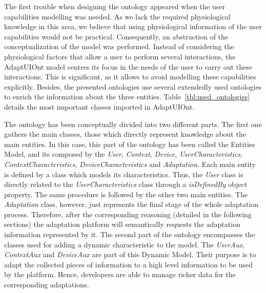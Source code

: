 The first trouble when designing the ontology appeared when the user capabilities
modelling was needed. As we lack the required physiological knowledge in this area,
we believe that using physiological information of the user capabilities would
not be practical. Consequently, an abstraction of the conceptualization of the model was
performed. Instead of considering the physiological factors that allow a user to
perform several interactions, the AdaptUIOnt model centres its focus in the needs
of the user to carry out these interactions. This is significant, as it allows
to avoid modelling these capabilities explicitly. Besides, the presented ontologies
use several extendedly used ontologies to enrich the information about the three
entities. Table~\ref{tbl:used_ontologies} details the most important classes
imported in AdaptUIOnt.

The ontology has been conceptually divided into two different parts. The first
one gathers the main classes, those which directly represent knowledge about
the main entities. In this case, this part of the ontology has been called the
Entities Model, and its composed by the \textit{User}, \textit{Context},
\textit{Device}, \textit{UserCharacteristics}, \textit{ContextCharacteristics},
\textit{DeviceCharacteristics} and \textit{Adaptation}. Each main entity is
defined by a class which models its characteristics. Thus, the \textit{User}
class is directly related to the \textit{UserCharacteristics} class through a
\textit{isDefinedBy} object property. The same procedure is followed by the other
two main entities. The \textit{Adaptation} class, however, just represents the
final stage of the whole adaptation process. Therefore, after the corresponding
reasoning (detailed in the following sections) the adaptation platform will
semantically requests the adaptation information represented by it. The second part
of the ontology encompasses the classes used for adding a dynamic characteristic
to the model. The \textit{UserAux}, \textit{ContextAux} and \textit{DeviceAux}
are part of this Dynamic Model. Their purpose is to adapt the collected pieces
of information to a high level information to be used by the platform. Hence,
developers are able to manage richer data for the corresponding adaptations.
